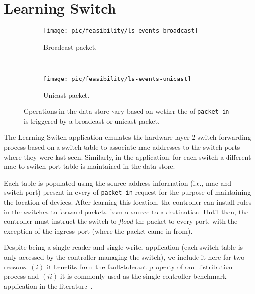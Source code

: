 \section{Learning Switch} 
\label{sec:feasibility:ls}
\glsresetall
\begin{figure}[ht]
  \begin{subfigure}[b]{0.5\textwidth}
                \centering
                \texttt{[image: pic/feasibility/ls-events-broadcast]}
                \caption{Broadcast packet.}
                \label{fig:ls:interaction:broadcast}
        \end{subfigure}%
        ~
        \begin{subfigure}[b]{0.5\textwidth}
                \centering
                \texttt{[image: pic/feasibility/ls-events-unicast]}
                \caption{Unicast packet.}
                \label{fig:ls:interaction:unicast}
        \end{subfigure}
        \caption[Learning Switch workloads]{Operations in the data store vary based on wether the \gls{of} \texttt{packet-in} is triggered by a broadcast or unicast packet.}
        \label{fig:ls:interaction}
\end{figure}

The Learning Switch application emulates the hardware layer 2 switch forwarding process based on a switch table to associate  \gls{mac} addresses to the switch ports where they were last seen. 
Similarly, in the application, for each switch a different \gls{mac}-to-switch-port table is maintained in the data store. 

Each table is populated using the source address information (i.e., \gls{mac} and switch port)  present in every \gls{of}  \texttt{packet-in} request for the purpose of maintaining the location of devices. 
After learning this location, the controller can install rules in the switches to forward packets from a source to  a destination. 
Until then, the controller must instruct the switch to \emph{flood} the packet to every port, with the exception of the ingress port (where the packet came in from).

Despite being a single-reader and single writer application (each switch table is only accessed by the controller managing the switch), we include it here for two reasons: $(i)$ it benefits from the fault-tolerant property of our distribution process and $(ii)$ it is commonly used as the single-controller benchmark application in the literature~\cite{Tootoonchian:2012uia,Erickson:2013er}. 

